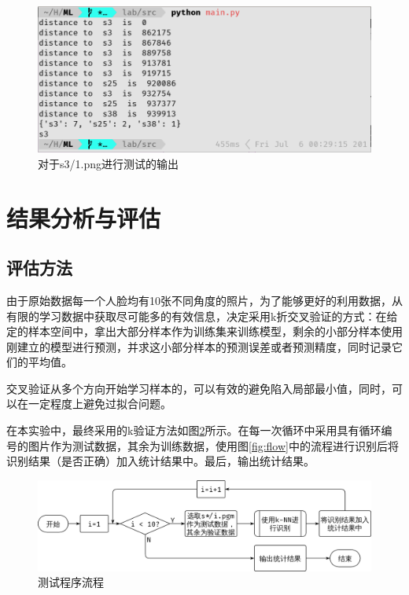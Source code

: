 \documentclass{article}
\begin{document}
\begin{figure}[htpb]
    \centering
    \includegraphics[width=0.95\linewidth]{output.png}
    \caption{对于s3/1.png进行测试的输出}
    \label{fig:output}
\end{figure}

\section{结果分析与评估}
\label{sec:jie_guo_fen_xi_yu_ping_gu_}

\subsection{评估方法}
\label{sub:ping_gu_fang_fa_}
\par 由于原始数据每一个人脸均有10张不同角度的照片，为了能够更好的利用数据，从有限的学习数据中获取尽可能多的有效信息，决定采用k折交叉验证的方式：在给定的样本空间中，拿出大部分样本作为训练集来训练模型，剩余的小部分样本使用刚建立的模型进行预测，并求这小部分样本的预测误差或者预测精度，同时记录它们的平均值。
\par 交叉验证从多个方向开始学习样本的，可以有效的避免陷入局部最小值，同时，可以在一定程度上避免过拟合问题。
\par 在本实验中，最终采用的k验证方法如图\ref{fig:flow2}所示。在每一次循环中采用具有循环编号的图片作为测试数据，其余为训练数据，使用图\ref{fig:flow}中的流程进行识别后将识别结果（是否正确）加入统计结果中。最后，输出统计结果。

\begin{figure}[htpb]
    \centering
    \includegraphics[width=0.95\linewidth]{flow2.png}
    \caption{测试程序流程}
    \label{fig:flow2}
\end{figure}
\FloatBarrier
\end{document}
